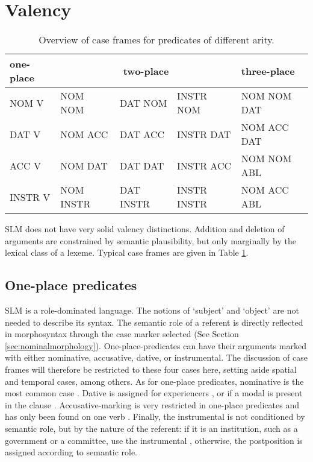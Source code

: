 \section{Valency}
\begin{table}
  \begin{tabular}{l|lll|l}
  one-place & \multicolumn{3}{c}{two-place}       & three-place \\
  \hline
  NOM V     & NOM NOM   & DAT NOM   & INSTR NOM   & NOM NOM DAT \\
  DAT V     & NOM ACC   & DAT ACC   & INSTR DAT   & NOM ACC DAT \\
  ACC V     & NOM DAT   & DAT DAT   & INSTR ACC   & NOM NOM ABL \\
  INSTR V   & NOM INSTR & DAT INSTR & INSTR INSTR & NOM ACC ABL \\
  \end{tabular}
\caption{Overview of case frames for predicates of different arity.}
\label{tab:ng:valency}
\end{table}

SLM does not have very solid valency distinctions. Addition and deletion of arguments are constrained by semantic plausibility, but only marginally by the lexical class of a lexeme. Typical case frames are given in Table \ref{tab:ng:valency}.

\subsection{One-place predicates}
SLM is a role-dominated language. The notions of `subject' and `object' are not needed to describe its syntax. The semantic role of a referent is directly reflected in morphosyntax through the case marker selected (See Section \ref{sec:nominalmorphology}). One-place-predicates can have their arguments marked with either nominative, accusative, dative, or instrumental. The discussion of case frames will therefore be restricted to these four cases here, setting aside spatial and temporal cases, among others. 
As for one-place predicates, nominative is the most common case . 
Dative is assigned for experiencers , or if a modal is present in the clause . 
Accusative-marking is very restricted in one-place predicates and has only been found on one verb  . 
Finally, the instrumental is not conditioned by semantic role, but by the nature of the referent: if it is an institution, such as a government or a committee, use the instrumental , otherwise, the postposition is assigned according to semantic role.



